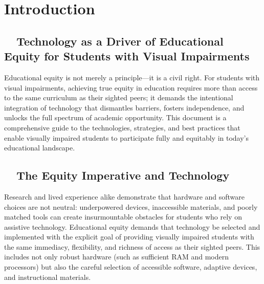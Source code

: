 \chapter{Introduction}\label{ch:introduction}

\section{~~Technology as a Driver of Educational Equity for Students with Visual Impairments}
\label{sec:intro-tech-equity}

Educational equity is not merely a principle—it is a civil right.\supercite{ADA1990, IDEA2004} For students with visual impairments, achieving true equity in education requires more than access to the same curriculum as their sighted peers; it demands the intentional integration of technology that dismantles barriers, fosters independence, and unlocks the full spectrum of academic opportunity.\supercite{Kelly2011, Day2021} This document is a comprehensive guide to the technologies, strategies, and best practices that enable visually impaired students to participate fully and equitably in today’s educational landscape.

\section{~~The Equity Imperative and Technology}
\label{sec:intro-equity-imperative}

Research and lived experience alike demonstrate that hardware and software choices are not neutral: underpowered devices, inaccessible materials, and poorly matched tools can create insurmountable obstacles for students who rely on assistive technology.\supercite{EducationalEquityReport2024, Smith2022, UserExperienceImprovements} Educational equity demands that technology be selected and implemented with the explicit goal of providing visually impaired students with the same immediacy, flexibility, and richness of access as their sighted peers.\supercite{Fowler2011ScreenReaderLatency, Sears1993TheEffectOfResponseTime, ScreenreaderLagImpact} This includes not only robust hardware (such as sufficient RAM and modern processors) but also the careful selection of accessible software, adaptive devices, and instructional materials.\supercite{Burgstahler2015, ModernProcessorBenefits, SoftwareMemoryDemands}

